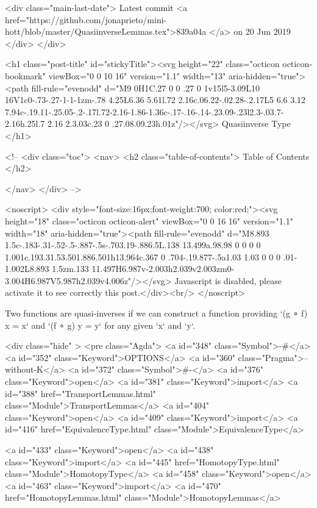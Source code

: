     <div class="main-last-date">
      Latest commit <a href="https://github.com/jonaprieto/mini-hott/blob/master/QuasiinverseLemmas.tex">839a04a </a> on  20 Jun 2019
    </div>
  </div>
  
  <h1 class="post-title" id="stickyTitle"><svg height="22" class="octicon octicon-bookmark" viewBox="0 0 10 16" version="1.1" width="13" aria-hidden="true"><path fill-rule="evenodd" d="M9 0H1C.27 0 0 .27 0 1v15l5-3.09L10 16V1c0-.73-.27-1-1-1zm-.78 4.25L6.36 5.61l.72 2.16c.06.22-.02.28-.2.17L5 6.6 3.12 7.94c-.19.11-.25.05-.2-.17l.72-2.16-1.86-1.36c-.17-.16-.14-.23.09-.23l2.3-.03.7-2.16h.25l.7 2.16 2.3.03c.23 0 .27.08.09.23h.01z"/></svg> Quasiinverse Type
  </h1>

  <!-- 
  <div class="toc">
    <nav>
    <h2 class="table-of-contents"> Table of Contents </h2>
      

    </nav>
  </div>
   -->

  <noscript>
  <div style="font-size:16px;font-weight:700; color:red;"><svg height="18" class="octicon octicon-alert" viewBox="0 0 16 16" version="1.1" width="18" aria-hidden="true"><path fill-rule="evenodd" d="M8.893 1.5c-.183-.31-.52-.5-.887-.5s-.703.19-.886.5L.138 13.499a.98.98 0 0 0 0 1.001c.193.31.53.501.886.501h13.964c.367 0 .704-.19.877-.5a1.03 1.03 0 0 0 .01-1.002L8.893 1.5zm.133 11.497H6.987v-2.003h2.039v2.003zm0-3.004H6.987V5.987h2.039v4.006z"/></svg> Javascript is disabled, please activate it to see correctly this post.</div><br/>
  </noscript>

  Two functions are quasi-inverses if we can construct a function providing
`(g ∘ f) x = x` and `(f ∘ g) y = y` for any given `x` and `y`.

<div class="hide" >
<pre class="Agda">
<a id="348" class="Symbol">{-#</a> <a id="352" class="Keyword">OPTIONS</a> <a id="360" class="Pragma">--without-K</a> <a id="372" class="Symbol">#-}</a>
<a id="376" class="Keyword">open</a> <a id="381" class="Keyword">import</a> <a id="388" href="TransportLemmas.html" class="Module">TransportLemmas</a>
<a id="404" class="Keyword">open</a> <a id="409" class="Keyword">import</a> <a id="416" href="EquivalenceType.html" class="Module">EquivalenceType</a>

<a id="433" class="Keyword">open</a> <a id="438" class="Keyword">import</a> <a id="445" href="HomotopyType.html" class="Module">HomotopyType</a>
<a id="458" class="Keyword">open</a> <a id="463" class="Keyword">import</a> <a id="470" href="HomotopyLemmas.html" class="Module">HomotopyLemmas</a>

